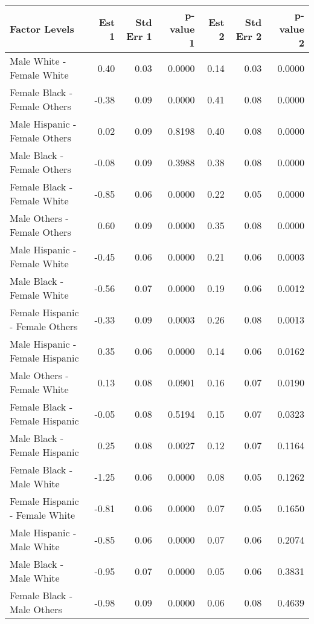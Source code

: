 \documentclass[11pt]{extarticle} %
\begin{document}
\begin{table}[ht]
\footnotesize
\centering
\begin{tabular}{lrrrrrr}
  \hline
Factor Levels & Est 1 & Std Err 1 & p-value 1 & Est 2 & Std Err 2 & p-value 2 \\ 
  \hline
  Male White -  Female White & 0.40 & 0.03 & 0.0000 & 0.14 & 0.03 & 0.0000 \\ 
    Female Black -  Female Others & -0.38 & 0.09 & 0.0000 & 0.41 & 0.08 & 0.0000 \\ 
    Male Hispanic -  Female Others & 0.02 & 0.09 & 0.8198 & 0.40 & 0.08 & 0.0000 \\ 
    Male Black -  Female Others & -0.08 & 0.09 & 0.3988 & 0.38 & 0.08 & 0.0000 \\ 
    Female Black -  Female White & -0.85 & 0.06 & 0.0000 & 0.22 & 0.05 & 0.0000 \\ 
    Male Others -  Female Others & 0.60 & 0.09 & 0.0000 & 0.35 & 0.08 & 0.0000 \\ 
    Male Hispanic -  Female White & -0.45 & 0.06 & 0.0000 & 0.21 & 0.06 & 0.0003 \\ 
    Male Black -  Female White & -0.56 & 0.07 & 0.0000 & 0.19 & 0.06 & 0.0012 \\ 
    Female Hispanic -  Female Others & -0.33 & 0.09 & 0.0003 & 0.26 & 0.08 & 0.0013 \\ 
    Male Hispanic -  Female Hispanic & 0.35 & 0.06 & 0.0000 & 0.14 & 0.06 & 0.0162 \\ 
    Male Others -  Female White & 0.13 & 0.08 & 0.0901 & 0.16 & 0.07 & 0.0190 \\ 
    Female Black -  Female Hispanic & -0.05 & 0.08 & 0.5194 & 0.15 & 0.07 & 0.0323 \\ 
    Male Black -  Female Hispanic & 0.25 & 0.08 & 0.0027 & 0.12 & 0.07 & 0.1164 \\ 
    Female Black -  Male White & -1.25 & 0.06 & 0.0000 & 0.08 & 0.05 & 0.1262 \\ 
    Female Hispanic -  Female White & -0.81 & 0.06 & 0.0000 & 0.07 & 0.05 & 0.1650 \\ 
    Male Hispanic -  Male White & -0.85 & 0.06 & 0.0000 & 0.07 & 0.06 & 0.2074 \\ 
    Male Black -  Male White & -0.95 & 0.07 & 0.0000 & 0.05 & 0.06 & 0.3831 \\ 
    Female Black -  Male Others & -0.98 & 0.09 & 0.0000 & 0.06 & 0.08 & 0.4639 \\ 

\end{tabular}
\end{table}
\end{document}
